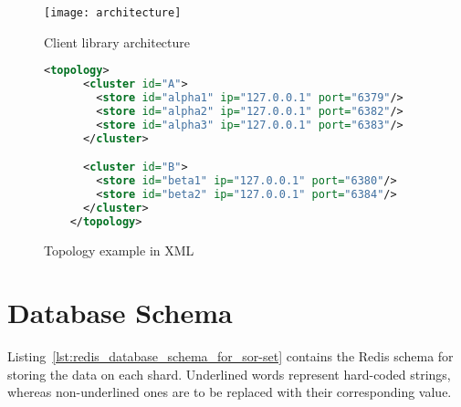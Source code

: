\begin{figure}[t]
  \centering
  \begin{minipage}{1\linewidth}
    \centering
    \texttt{[image: architecture]}
    \caption{Client library architecture}
    \label{fig:architecture}
  \end{minipage}
\end{figure}

\begin{figure}[t]
  \begin{minipage}{1\linewidth}
    \begin{lstlisting}[language=XML]
    <topology>
      <cluster id="A">
        <store id="alpha1" ip="127.0.0.1" port="6379"/>
        <store id="alpha2" ip="127.0.0.1" port="6382"/>
        <store id="alpha3" ip="127.0.0.1" port="6383"/>
      </cluster>

      <cluster id="B">
        <store id="beta1" ip="127.0.0.1" port="6380"/>
        <store id="beta2" ip="127.0.0.1" port="6384"/>
      </cluster>
    </topology>
    \end{lstlisting}
    \caption{Topology example in XML}
    \label{fig:topology}
  \end{minipage}
\end{figure}

\section{Database Schema}
\label{sec:database_schema}

Listing~\ref{lst:redis_database_schema_for_sor-set} contains the Redis schema
for storing the data on each shard. Underlined words represent hard-coded
strings, whereas non-underlined ones are to be replaced with their corresponding
value.

